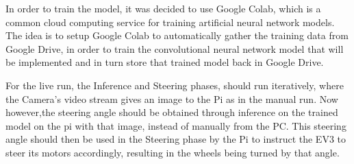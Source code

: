 In order to train the model, it was decided to use Google Colab, which is a common cloud computing service for training artificial neural network models. The idea is to setup Google Colab to automatically gather the training data from Google Drive, in order to train the convolutional neural network model that will be implemented and in turn store that trained model back in Google Drive.

For the live run, the Inference and Steering phases, should run iteratively, where the Camera's video stream gives an image to the Pi as in the manual run. Now however,the steering angle should be obtained through inference on the trained model on the pi with that image, instead of manually from the PC. This steering angle should then be used in the Steering phase by the Pi to instruct the EV3 to steer its motors accordingly, resulting in the wheels being turned by that angle.